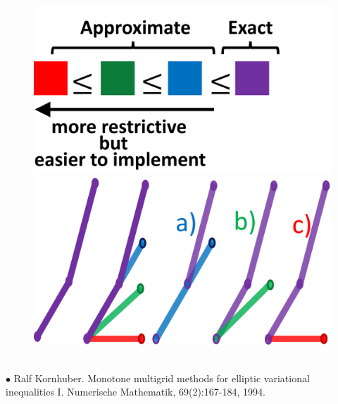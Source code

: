 \documentclass[8pt, oneside]{beamer}   	%
\begin{document}
\begin{frame}
\begin{itemize}
{\begin{figure}[htbp!]
\includegraphics[scale=0.11]{img/coarseconstraintexactapprox.pdf}
		\includegraphics[scale=0.11]{img/coarseconstraintabc.pdf}
\end{figure}
}
\end{itemize}
${}$\\
\tiny{$\bullet$
Ralf Kornhuber. Monotone multigrid methods for elliptic variational inequalities I. Numerische Mathematik, 69(2):167-184, 1994.}

\end{frame}
\end{document}
